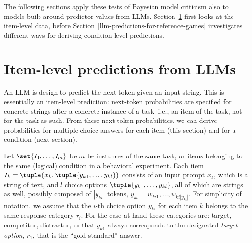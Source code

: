 \documentclass[fleqn]{article}
\begin{document}
The following sections apply these tests of Bayesian model criticism also to models built around predictor values from LLMs.
Section~\ref{sec:item-level-pred} first looks at the item-level data, before Section~\ref{llm-predictions-for-reference-games} investigates different ways for deriving condition-level predictions.


\section{Item-level predictions from LLMs}
\label{sec:item-level-pred}

An LLM is design to predict the next token given an input string.
This is essentially an item-level prediction: next-token probabilities are specified for concrete strings after a concrete instance of a task, i.e., an item of the task, not for the task as such.
From these next-token probabilities, we can derive probabilities for multiple-choice answers for each item (this section) and for a condition (next section).

Let $\set{I_{1}, \dots, I_{m}}$ be $m$ be instances of the same task, or items belonging to the same (logical) condition in a behavioral experiment.
Each item $I_{k} = \tuple{x_{k}, \tuple{y_{k1}, \dots, y_{kl}}}$ consists of an input prompt $x_{k}$, which is a string of text, and $l$ choice options $\tuple{y_{k1}, \dots, y_{kl}}$, all of which are strings as well, possibly composed of $|y_{ki}|$ tokens, $y_{ki} = w_{ki1}, \dots, w_{ki|y_{ki}|}$.
For simplicity of notation, we assume that the $i$-th choice option $y_{ki}$ for each item $k$ belongs to the same response category $r_{i}$.
For the case at hand these categories are: target, competitor, distractor, so that $y_{k1}$ always corresponds to the designated \emph{target option}, $r_{1}$, that is the ``gold standard'' answer.
\end{document}

